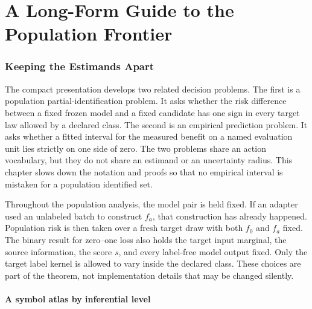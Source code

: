 
\part{A Long-Form Guide to the Population Frontier}
\label{fr:part-theory-exposition}

\section{Keeping the Estimands Apart}
\label{fr:sec-estimands}

The compact presentation develops two related decision problems.  The first is a population
partial-identification problem.  It asks whether the risk difference between a fixed frozen model
and a fixed candidate has one sign in every target law allowed by a declared class.  The second is
an empirical prediction problem.  It asks whether a fitted interval for the measured benefit on a
named evaluation unit lies strictly on one side of zero.  The two problems share an action
vocabulary, but they do not share an estimand or an uncertainty radius.  This chapter slows down
the notation and proofs so that no empirical interval is mistaken for a population identified set.

Throughout the population analysis, the model pair is held fixed.  If an adapter used an unlabeled
batch to construct $f_a$, that construction has already happened.  Population risk is then taken
over a fresh target draw with both $f_0$ and $f_a$ fixed.  The binary result for zero--one loss also
holds the target input marginal, the source information, the score $s$, and every label-free model
output fixed.  Only the target label kernel is allowed to vary inside the declared class.  These
choices are part of the theorem, not implementation details that may be changed silently.

\subsection{A symbol atlas by inferential level}
\label{fr:subsec-symbol-atlas}

